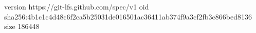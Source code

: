 version https://git-lfs.github.com/spec/v1
oid sha256:4b1c1c4d48c6f2ca5b25031de016501ac36411ab374f9a3cf2fb3c866bed8136
size 186448
